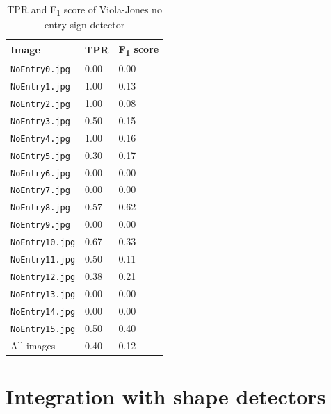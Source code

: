 \documentclass[twocolumn, 10pt, a4paper]{article}
\begin{document}
\begin{table}[htbp]
  \begin{center}
  \caption{TPR and F\textsubscript{1} score of Viola-Jones no entry sign detector}\label{tab:vj}
  \begin{tabular}{l | l l} 
    \hline\hline
    Image&TPR&F\textsubscript{1} score\\
    \hline
    \texttt{NoEntry0.jpg}&0.00&0.00\\ 
    \texttt{NoEntry1.jpg}&1.00&0.13\\ 
    \texttt{NoEntry2.jpg}&1.00&0.08\\ 
    \texttt{NoEntry3.jpg}&0.50&0.15\\ 
    \texttt{NoEntry4.jpg}&1.00&0.16\\ 
    \texttt{NoEntry5.jpg}&0.30&0.17\\ 
    \texttt{NoEntry6.jpg}&0.00&0.00\\ 
    \texttt{NoEntry7.jpg}&0.00&0.00\\
    \texttt{NoEntry8.jpg}&0.57&0.62\\ 
    \texttt{NoEntry9.jpg}&0.00&0.00\\ 
    \texttt{NoEntry10.jpg}&0.67&0.33\\ 
    \texttt{NoEntry11.jpg}&0.50&0.11\\ 
    \texttt{NoEntry12.jpg}&0.38&0.21\\ 
    \texttt{NoEntry13.jpg}&0.00&0.00\\ 
    \texttt{NoEntry14.jpg}&0.00&0.00\\ 
    \texttt{NoEntry15.jpg}&0.50&0.40\\ 
    \hdashline
    All images&0.40&0.12\\ 
    \hline
  \end{tabular}
  \end{center}
\end{table} 

\clearpage

\section{Integration with shape detectors}
\end{document}
